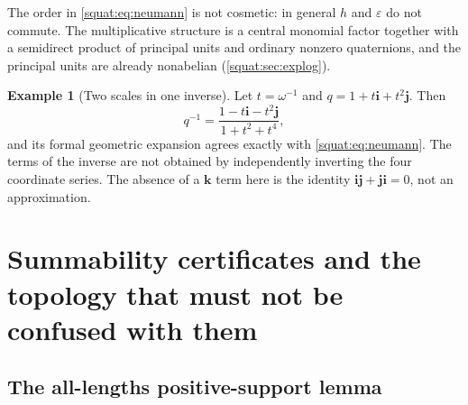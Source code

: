 \documentclass[11pt,letterpaper]{article}
\numberwithin{equation}{section}
\theoremstyle{definition}
\newtheorem{example}[example]{Example}
\theoremstyle{remark}
\newcommand{\eps}{\varepsilon}
\newcommand{\ii}{\mathbf i}
\newcommand{\jj}{\mathbf j}
\newcommand{\kk}{\mathbf k}
\begin{document}
The order in \cref{squat:eq:neumann} is not cosmetic: in general $h$ and $\eps$ do not
commute. The multiplicative structure is a central monomial factor together with a
semidirect product of principal units and ordinary nonzero quaternions, and the principal
units are already nonabelian (\cref{squat:sec:explog}).

\begin{example}[Two scales in one inverse]\label{squat:ex:twoscaleinverse}
Let $t=\omega^{-1}$ and $q=1+t\ii+t^2\jj$. Then
\[
 q^{-1}=\frac{1-t\ii-t^2\jj}{1+t^2+t^4},
\]
and its formal geometric expansion agrees exactly with \cref{squat:eq:neumann}. The terms
of the inverse are not obtained by independently inverting the four coordinate series.
The absence of a $\kk$ term here is the identity $\ii\jj+\jj\ii=0$, not an approximation.
\end{example}

\section{Summability certificates and the topology that must not be confused with them}
\label{squat:sec:topology}

\subsection{The all-lengths positive-support lemma}\label{squat:sub:neumann}
\end{document}
